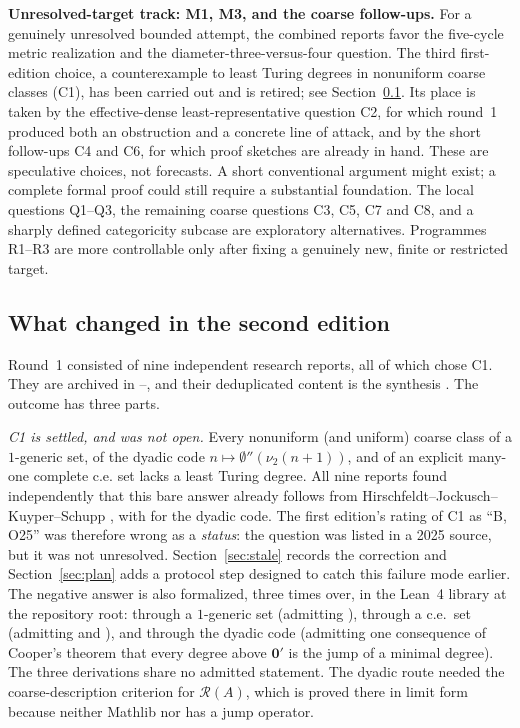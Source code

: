 \documentclass[11pt,a4paper]{article}
\newcommand{\R}{\mathcal R}
\newcommand{\zero}{\mathbf0}
\theoremstyle{definition}\newtheorem{definition}[theorem]{Definition}
\theoremstyle{remark}\newtheorem{remark}[theorem]{Remark}
\begin{document}
\textbf{Unresolved-target track: M1, M3, and the coarse follow-ups.} For a genuinely unresolved bounded attempt, the combined reports favor the five-cycle metric realization and the diameter-three-versus-four question. The third first-edition choice, a counterexample to least Turing degrees in nonuniform coarse classes (C1), has been carried out and is retired; see Section~\ref{sec:changes}. Its place is taken by the effective-dense least-representative question C2, for which round~1 produced both an obstruction and a concrete line of attack, and by the short follow-ups C4 and C6, for which proof sketches are already in hand. These are speculative choices, not forecasts. A short conventional argument might exist; a complete formal proof could still require a substantial foundation. The local questions Q1--Q3, the remaining coarse questions C3, C5, C7 and C8, and a sharply defined categoricity subcase are exploratory alternatives. Programmes R1--R3 are more controllable only after fixing a genuinely new, finite or restricted target.

\subsection{What changed in the second edition}
\label{sec:changes}
Round~1 consisted of nine independent research reports, all of which chose C1. They are archived in --, and their deduplicated content is the synthesis \cite{Synthesis}. The outcome has three parts.

\emph{C1 is settled, and was not open.} Every nonuniform (and uniform) coarse class of a $1$-generic set, of the dyadic code $n\mapsto\emptyset''(\nu_2(n+1))$, and of an explicit many-one complete c.e. set lacks a least Turing degree. All nine reports found independently that this bare answer already follows from Hirschfeldt--Jockusch--Kuyper--Schupp \cite[Theorems 4.2 and 4.3]{HJKS}, with \cite[Theorem 2.19]{JS} for the dyadic code. The first edition's rating of C1 as ``B, O25'' was therefore wrong as a \emph{status}: the question was listed in a 2025 source, but it was not unresolved. Section~\ref{sec:stale} records the correction and Section~\ref{sec:plan} adds a protocol step designed to catch this failure mode earlier. The negative answer is also formalized, three times over, in the Lean~4 library  at the repository root: through a $1$-generic set (admitting \cite[Theorem 4.2]{HJKS}), through a c.e.\ set (admitting \cite[Theorem 2.26]{JS} and \cite[Theorem 4.3]{HJKS}), and through the dyadic code (admitting one consequence of Cooper's theorem that every degree above $\zero'$ is the jump of a minimal degree). The three derivations share no admitted statement. The dyadic route needed the coarse-description criterion for $\R(A)$, which is proved there in limit form because neither Mathlib nor  has a jump operator.
\end{document}
